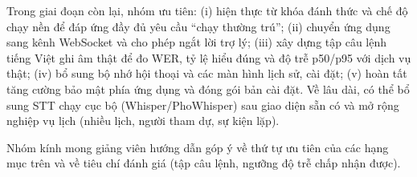 Trong giai đoạn còn lại, nhóm ưu tiên: (i) hiện thực từ khóa đánh thức và chế độ chạy nền để đáp ứng đầy đủ yêu cầu “chạy thường trú”; (ii) chuyển ứng dụng sang kênh WebSocket và cho phép ngắt lời trợ lý; (iii) xây dựng tập câu lệnh tiếng Việt ghi âm thật để đo WER, tỷ lệ hiểu đúng và độ trễ p50/p95 với dịch vụ thật; (iv) bổ sung bộ nhớ hội thoại và các màn hình lịch sử, cài đặt; (v) hoàn tất tăng cường bảo mật phía ứng dụng và đóng gói bản cài đặt. Về lâu dài, có thể bổ sung STT chạy cục bộ (Whisper/PhoWhisper) sau giao diện sẵn có và mở rộng nghiệp vụ lịch (nhiều lịch, người tham dự, sự kiện lặp).

Nhóm kính mong giảng viên hướng dẫn góp ý về thứ tự ưu tiên của các hạng mục trên và về tiêu chí đánh giá (tập câu lệnh, ngưỡng độ trễ chấp nhận được).
